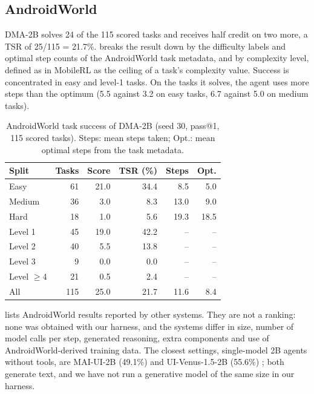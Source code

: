 \documentclass{article}
\newcommand{\ours}{DMA-2B}
\begin{document}
\subsection{AndroidWorld}
\label{sec:aw}
\ours{} solves 24 of the 115 scored tasks and receives half credit on two more, a TSR of 25/115 = 21.7\%.
 breaks the result down by the difficulty labels and optimal step counts of the AndroidWorld task
metadata, and by complexity level, defined as in MobileRL as the ceiling of a task's complexity value. Success
is concentrated in easy and level-1 tasks. On the tasks it solves, the agent uses more steps than the optimum
(5.5 against 3.2 on easy tasks, 6.7 against 5.0 on medium tasks).

\begin{table}[t]
\centering
\caption{AndroidWorld task success of \ours{} (seed 30, pass@1, 115 scored tasks). Steps: mean steps taken;
Opt.: mean optimal steps from the task metadata.}
\label{tab:aw}
\small
\setlength{\tabcolsep}{4pt}
\begin{tabular}{@{}l r r r r r@{}}
\toprule
Split & Tasks & Score & TSR (\%) & Steps & Opt. \\
\midrule
Easy   & 61 & 21.0 & 34.4 & 8.5  & 5.0 \\
Medium & 36 & 3.0  & 8.3  & 13.0 & 9.0 \\
Hard   & 18 & 1.0  & 5.6  & 19.3 & 18.5 \\
\midrule
Level 1 & 45 & 19.0 & 42.2 & -- & -- \\
Level 2 & 40 & 5.5  & 13.8 & -- & -- \\
Level 3 & 9  & 0.0  & 0.0  & -- & -- \\
Level $\geq$4 & 21 & 0.5 & 2.4 & -- & -- \\
\midrule
All    & 115 & 25.0 & 21.7 & 11.6 & 8.4 \\
\bottomrule
\end{tabular}
\end{table}

 lists AndroidWorld results reported by other systems. They are not a ranking: none was obtained
with our harness, and the systems differ in size, number of model calls per step, generated reasoning, extra
components and use of AndroidWorld-derived training data. The closest settings, single-model 2B agents without
tools, are MAI-UI-2B (49.1\%) \citep{maiui2025} and UI-Venus-1.5-2B (55.6\%) \citep{uivenus15}; both generate
text, and we have not run a generative model of the same size in our harness.
\end{document}

